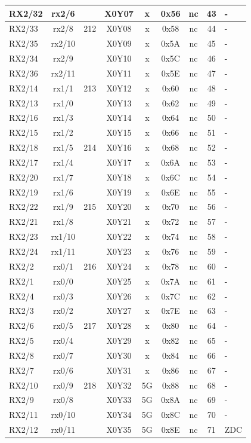 \begin{longtable}{|l|c|c|c|c|c|c|c|l|}
RX2/32 & rx2/6  &     & X0Y07 &  x  & 0x56 & nc & 43 & -\\\hline   
RX2/33 & rx2/8  & 212 & X0Y08 &  x  & 0x58 & nc & 44 & -\\\hline   
RX2/35 & rx2/10 &     & X0Y09 &  x  & 0x5A & nc & 45 & -\\\hline   
RX2/34 & rx2/9  &     & X0Y10 &  x  & 0x5C & nc & 46 & -\\\hline   
RX2/36 & rx2/11 &     & X0Y11 &  x  & 0x5E & nc & 47 & -\\\hline   
RX2/14 & rx1/1  & 213 & X0Y12 &  x  & 0x60 & nc & 48 & -\\\hline   
RX2/13 & rx1/0  &     & X0Y13 &  x  & 0x62 & nc & 49 & -\\\hline   
RX2/16 & rx1/3  &     & X0Y14 &  x  & 0x64 & nc & 50 & -\\\hline   
RX2/15 & rx1/2  &     & X0Y15 &  x  & 0x66 & nc & 51 & -\\\hline   
RX2/18 & rx1/5  & 214 & X0Y16 &  x  & 0x68 & nc & 52 & -\\\hline   
RX2/17 & rx1/4  &     & X0Y17 &  x  & 0x6A & nc & 53 & -\\\hline   
RX2/20 & rx1/7  &     & X0Y18 &  x  & 0x6C & nc & 54 & -\\\hline   
RX2/19 & rx1/6  &     & X0Y19 &  x  & 0x6E & nc & 55 & -\\\hline   
RX2/22 & rx1/9  & 215 & X0Y20 &  x  & 0x70 & nc & 56 & -\\\hline   
RX2/21 & rx1/8  &     & X0Y21 &  x  & 0x72 & nc & 57 & -\\\hline   
RX2/23 & rx1/10 &     & X0Y22 &  x  & 0x74 & nc & 58 & -\\\hline   
RX2/24 & rx1/11 &     & X0Y23 &  x  & 0x76 & nc & 59 & -\\\hline   
RX2/2  & rx0/1  & 216 & X0Y24 &  x  & 0x78 & nc & 60 & -\\\hline   
RX2/1  & rx0/0  &     & X0Y25 &  x  & 0x7A & nc & 61 & -\\\hline   
RX2/4  & rx0/3  &     & X0Y26 &  x  & 0x7C & nc & 62 & -\\\hline   
RX2/3  & rx0/2  &     & X0Y27 &  x  & 0x7E & nc & 63 & -\\\hline   
RX2/6  & rx0/5  & 217 & X0Y28 &  x  & 0x80 & nc & 64 & -\\\hline   
RX2/5  & rx0/4  &     & X0Y29 &  x  & 0x82 & nc & 65 & -\\\hline   
RX2/8  & rx0/7  &     & X0Y30 &  x  & 0x84 & nc & 66 & -\\\hline   
RX2/7  & rx0/6  &     & X0Y31 &  x  & 0x86 & nc & 67 & -\\\hline   
RX2/10 & rx0/9  & 218 & X0Y32 &  5G & 0x88 & nc & 68 & -\\\hline   
RX2/9  & rx0/8  &     & X0Y33 &  5G & 0x8A & nc & 69 & -\\\hline   
RX2/11 & rx0/10 &     & X0Y34 &  5G & 0x8C & nc & 70 & -\\\hline   
RX2/12 & rx0/11 &     & X0Y35 &  5G & 0x8E & nc & 71 & ZDC\\\hline   
\end{longtable}                  


